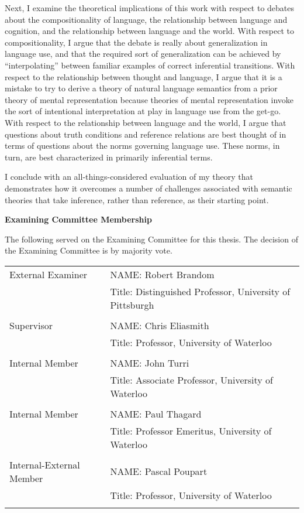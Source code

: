 Next, I examine the theoretical implications of this work with respect to debates about the compositionality of language, the relationship between language and cognition, and the relationship between language and the world. With respect to compositionality, I argue that the debate is really about generalization in language use, and that the required sort of generalization can be achieved by ``interpolating'' between familiar examples of correct inferential transitions. With respect to the relationship between thought and language, I argue that it is a mistake to try to derive a theory of natural language semantics from a prior theory of mental representation because theories of mental representation invoke the sort of intentional interpretation at play in language use from the get-go. With respect to the relationship between language and the world, I argue that questions about truth conditions and reference relations are best thought of in terms of questions about the norms governing language use. These norms, in turn, are best characterized in primarily inferential terms. 

I conclude with an all-things-considered evaluation of my theory that demonstrates how it overcomes a number of challenges associated with semantic theories that take inference, rather than reference, as their starting point. 


\cleardoublepage


\begin{center}\textbf{Examining Committee Membership}\end{center}

The following served on the Examining Committee for this thesis. The decision of the Examining Committee is by majority vote.

\vskip 0.12in
\begin{tabular}{l l} 

External Examiner  &  NAME: Robert Brandom  \\
  &  Title: Distinguished Professor, University of Pittsburgh \\
  & \\ 
Supervisor  &  NAME: Chris Eliasmith \\
  & Title: Professor, University of Waterloo \\
  & \\ 
Internal Member  &  NAME: John Turri \\ 
 & Title: Associate Professor, University of Waterloo \\
 & \\ 
Internal Member  &  NAME: Paul Thagard \\
 & Title: Professor Emeritus, University of Waterloo \\
 & \\ 
Internal-External Member  &  NAME: Pascal Poupart \\
 & Title: Professor, University of Waterloo \\
   & \\

\end{tabular} 



